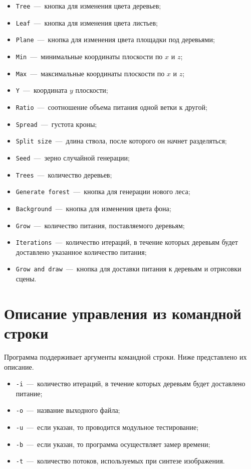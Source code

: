 \begin{itemize}
\item \texttt{Tree}~---~кнопка для изменения цвета деревьев;
\item \texttt{Leaf}~---~кнопка для изменения цвета листьев;
\item \texttt{Plane}~---~кнопка для изменения цвета площадки под деревьями;
\item \texttt{Min}~---~минимальные координаты плоскости по $x$ и $z$;
\item \texttt{Max}~---~максимальные координаты плоскости по $x$ и $z$;
\item \texttt{Y}~---~координата $y$ плоскости;
\item \texttt{Ratio}~---~соотношение объема питания одной ветки к другой;
\item \texttt{Spread}~---~густота кроны;
\item \texttt{Split size}~---~длина ствола, после которого он начнет разделяться;
\item \texttt{Seed}~---~зерно случайной генерации;
\item \texttt{Trees}~---~количество деревьев;
\item \texttt{Generate forest}~---~кнопка для генерации нового леса;
\item \texttt{Background}~---~кнопка для изменения цвета фона;
\item \texttt{Grow}~---~количество питания, поставляемого деревьям;
\item \texttt{Iterations}~---~количество итераций, в течение которых деревьям будет доставлено указанное количество питания;
\item \texttt{Grow and draw}~---~кнопка для доставки питания к деревьям и отрисовки сцены.
\end{itemize}

\section{Описание управления из командной строки}

Программа поддерживает аргументы командной строки. Ниже представлено их описание.

\begin{itemize}
	\item \texttt{-i}~---~количество итераций, в течение которых деревьям будет доставлено питание;
	\item \texttt{-o}~---~название выходного файла;
	\item \texttt{-u}~---~если указан, то проводится модульное тестирование;
	\item \texttt{-b}~---~если указан, то программа осуществляет замер времени;
	\item \texttt{-t}~---~количество потоков, используемых при синтезе изображения.
\end{itemize}

